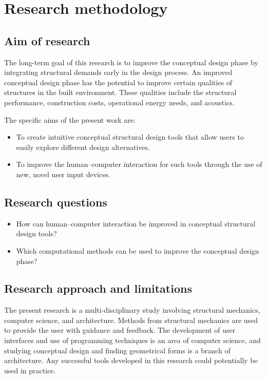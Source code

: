 \section{Research methodology }
\subsection{Aim of research}
The long-term goal of this research is to improve the conceptual design phase by integrating structural demands early in the design process. An improved conceptual design phase has the potential to improve certain qualities of structures in the built environment. These qualities include the structural performance, construction costs, operational energy needs, and acoustics.

The specific aims of the present work are:
\begin{itemize}  
\item  To create intuitive conceptual structural design tools that allow users to easily explore different design alternatives.
\item To improve the human--computer interaction for such tools through the use of new, novel user input devices. 
\end{itemize}


\subsection{Research questions}
\begin{itemize}  
\item How can human--computer interaction be improved in conceptual structural design tools?
\item  Which computational methods can be used to improve the conceptual design phase? 
\end{itemize}

\subsection{Research approach and limitations}
The present research is a multi-disciplinary study involving structural mechanics, computer science, and architecture. Methods from structural mechanics are used to provide the user with guidance and feedback. The development of user interfaces and use of programming techniques is an area of computer science, and studying conceptual design and finding geometrical forms is a branch of architecture. Any successful tools developed in this research could potentially be used in practice.

